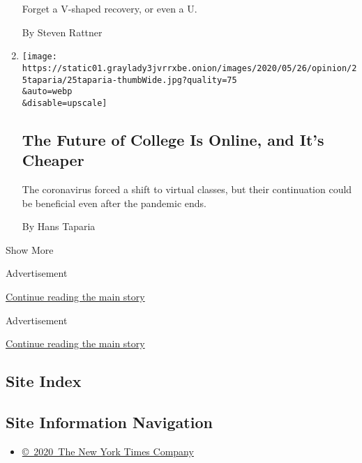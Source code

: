 \begin{enumerate}
  Forget a V-shaped recovery, or even a U.

  By Steven Rattner
\item
  \href{/2020/05/25/opinion/online-college-coronavirus.html}{}

  \texttt{[image: https://static01.graylady3jvrrxbe.onion/images/2020/05/26/opinion/25taparia/25taparia-thumbWide.jpg?quality=75\\\&auto=webp\\\&disable=upscale]}

  \hypertarget{the-future-of-college-is-online-and-its-cheaper}{%
  \subsection{The Future of College Is Online, and It's
  Cheaper}\label{the-future-of-college-is-online-and-its-cheaper}}

  The coronavirus forced a shift to virtual classes, but their
  continuation could be beneficial even after the pandemic ends.

  By Hans Taparia
\end{enumerate}

Show More

Advertisement

\protect\hyperlink{after-mid1}{Continue reading the main story}

Advertisement

\protect\hyperlink{after-mktg}{Continue reading the main story}

\hypertarget{site-index}{%
\subsection{Site Index}\label{site-index}}

\hypertarget{site-information-navigation}{%
\subsection{Site Information
Navigation}\label{site-information-navigation}}

\begin{itemize}
\tightlist
\item
  \href{https://help.nytimes3xbfgragh.onion/hc/en-us/articles/115014792127-Copyright-notice}{©~2020~The
  New York Times Company}
\end{itemize}

